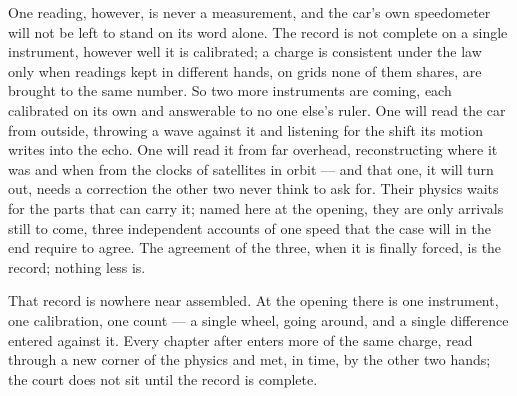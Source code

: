 One reading, however, is never a measurement, and the car's own speedometer will not be left to stand on its
word alone. The record is not complete on a single instrument, however well it is calibrated; a charge is
consistent under the law only when readings kept in different hands, on grids none of them shares, are brought
to the same number. So two more instruments are coming, each calibrated on its own and answerable to no one
else's ruler. One will read the car from outside, throwing a wave against it and listening for the shift its
motion writes into the echo. One will read it from far overhead, reconstructing where it was and when from the
clocks of satellites in orbit --- and that one, it will turn out, needs a correction the other two never think
to ask for. Their physics waits for the parts that can carry it; named here at the opening, they are only
arrivals still to come, three independent accounts of one speed that the case will in the end require to agree.
The agreement of the three, when it is finally forced, is the record; nothing less is.

That record is nowhere near assembled. At the opening there is one instrument, one calibration, one count --- a
single wheel, going around, and a single difference entered against it. Every chapter after enters more of the
same charge, read through a new corner of the physics and met, in time, by the other two hands; the court does
not sit until the record is complete.

